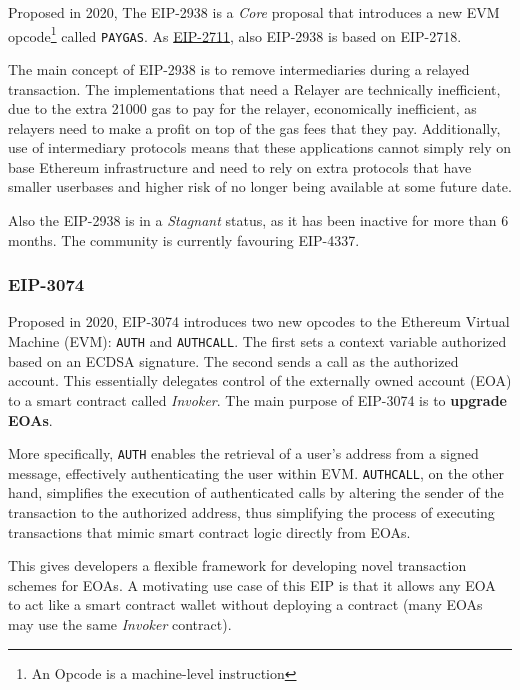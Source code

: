 Proposed in 2020, The EIP-2938 is a \textit{Core} proposal that introduces a new EVM opcode\footnote{An Opcode is a machine-level instruction} called \texttt{PAYGAS}. As \hyperref[subsubsec:eip-2711]{EIP-2711}, also EIP-2938 is based on EIP-2718.

The main concept of EIP-2938 is to remove intermediaries during a relayed transaction. The implementations that need a Relayer are technically inefficient, due to the extra 21000 gas to pay for the relayer, economically inefficient, as relayers need to make a profit on top of the gas fees that they pay. Additionally, use of intermediary protocols means that these applications cannot simply rely on base Ethereum infrastructure and need to rely on extra protocols that have smaller userbases and higher risk of no longer being available at some future date. \cite{eip-2938}

Also the EIP-2938 is in a \textit{Stagnant} status, as it has been inactive for more than 6 months. The community is currently favouring EIP-4337. \cite{ethereum-account-abstraction}

\subsubsection{EIP-3074}
\label{subsubsec:eip-3074}

Proposed in 2020, EIP-3074 introduces two new opcodes to the Ethereum Virtual Machine (EVM): \texttt{AUTH} and \texttt{AUTHCALL}. The first sets a context variable authorized based on an ECDSA signature. The second sends a call as the authorized account. This essentially delegates control of the externally owned account (EOA) to a smart contract called \textit{Invoker}. The main purpose of EIP-3074 is to \textbf{upgrade EOAs}. \cite{eip-3074}

More specifically, \texttt{AUTH} enables the retrieval of a user's address from a signed message, effectively authenticating the user within EVM. \texttt{AUTHCALL}, on the other hand, simplifies the execution of authenticated calls by altering the sender of the transaction to the authorized address, thus simplifying the process of executing transactions that mimic smart contract logic directly from EOAs. \cite{ethereum-account-abstraction}

This gives developers a flexible framework for developing novel transaction schemes for EOAs. A motivating use case of this EIP is that it allows any EOA to act like a smart contract wallet without deploying a contract (many EOAs may use the same \textit{Invoker} contract). \cite{eip-3074}

